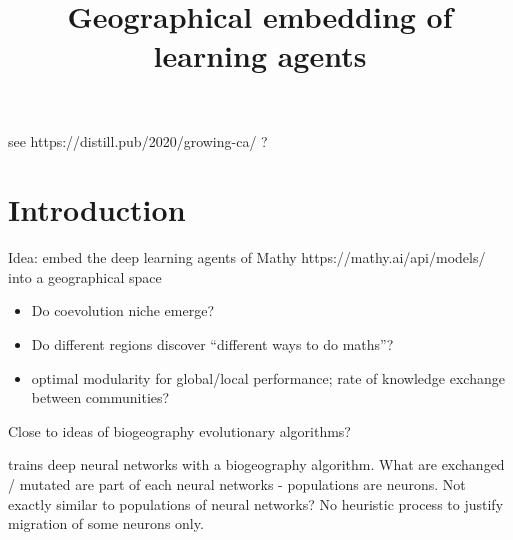 \documentclass{article}
\title{Geographical embedding of learning agents}
\author{}
\date{}
\begin{document}
\maketitle

see https://distill.pub/2020/growing-ca/ ?

\section{Introduction}

Idea: embed the deep learning agents of Mathy https://mathy.ai/api/models/ into a geographical space 

\begin{itemize}
    \item Do coevolution niche emerge?
    \item Do different regions discover ``different ways to do maths''?
    \item optimal modularity for global/local performance; rate of knowledge exchange between communities?
\end{itemize}

Close to ideas of biogeography evolutionary algorithms?

\cite{mirjalili2014let} trains deep neural networks with a biogeography algorithm. What are exchanged / mutated are part of each neural networks - populations are neurons. Not exactly similar to populations of neural networks? No heuristic process to justify migration of some neurons only.
\end{document}
